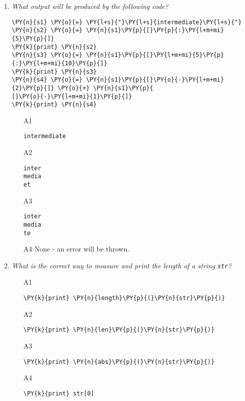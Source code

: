 \begin{enumerate}
\vspace{6mm}

\item {\em What output will be produced by the following code?}\\

\begin{Verbatim}[commandchars=\\\{\}]
\PY{n}{s1} \PY{o}{=} \PY{l+s}{"}\PY{l+s}{intermediate}\PY{l+s}{"}
\PY{n}{s2} \PY{o}{=} \PY{n}{s1}\PY{p}{[}\PY{p}{:}\PY{l+m+mi}{5}\PY{p}{]}
\PY{k}{print} \PY{n}{s2}
\PY{n}{s3} \PY{o}{=} \PY{n}{s1}\PY{p}{[}\PY{l+m+mi}{5}\PY{p}{:}\PY{l+m+mi}{10}\PY{p}{]}
\PY{k}{print} \PY{n}{s3}
\PY{n}{s4} \PY{o}{=} \PY{n}{s1}\PY{p}{[}\PY{o}{-}\PY{l+m+mi}{2}\PY{p}{]} \PY{o}{+} \PY{n}{s1}\PY{p}{
[}\PY{o}{-}\PY{l+m+mi}{1}\PY{p}{]}
\PY{k}{print} \PY{n}{s4}
\end{Verbatim}
\vspace{6mm}

\begin{enumerate}
\item[A1] 
\begin{verbatim}
intermediate
\end{verbatim}
\item[A2] 
\begin{verbatim}
inter
media
et
\end{verbatim}
\item[A3] 
\begin{verbatim}
inter
media
te
\end{verbatim}
\item[A4] None - an error will be thrown.
\end{enumerate}

\vspace{6mm}

\item {\em What is the correct way to measure and print the length of a string {\tt str}?}\\

\begin{enumerate}
\item[A1] 
\begin{Verbatim}[commandchars=\\\{\}]
\PY{k}{print} \PY{n}{length}\PY{p}{(}\PY{n}{str}\PY{p}{)}
\end{Verbatim}
\item[A2] 
\begin{Verbatim}[commandchars=\\\{\}]
\PY{k}{print} \PY{n}{len}\PY{p}{(}\PY{n}{str}\PY{p}{)}
\end{Verbatim}
\item[A3] 
\begin{Verbatim}[commandchars=\\\{\}]
\PY{k}{print} \PY{n}{abs}\PY{p}{(}\PY{n}{str}\PY{p}{)}
\end{Verbatim}
\item[A4] 
\begin{Verbatim}[commandchars=\\\{\}]
\PY{k}{print} str[0]
\end{Verbatim}
\end{enumerate}


\end{enumerate}

